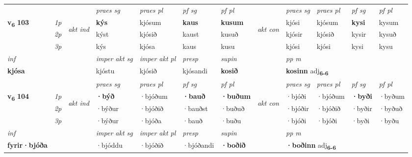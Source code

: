 \begin{longtable}[l]{X>{\footnotesize\itshape}llXXXXlXXXX}
 & &   & \textit{praes sg}  & \textit{praes pl}    & \textit{ pf sg} & \textit{pf pl} & & \textit{praes sg}  & \textit{praes pl}    & \textit{pf sg} & \textit{pf pl }  \\ \cmidrule{4-7} \cmidrule{9-12}
 \multirow{2}{*}{{{\textbf{v{\textsubscript{6}}} \Large{\textbf{103}}}}}  & 1p & \multirow{3}{*}{\begin{turn}{90}\textit{akt ind}\end{turn}} & \textbf{kýs} & kjósum & \textbf{kaus} & \textbf{kusum} & \multirow{3}{*}{\begin{turn}{90}\textit{akt con}\end{turn}} &kjósi & kjósum & \textbf{kysi} & kysum\\*
 & 2p &  &  kýst  & kjósið & kaust & kusuð & & kjósir & kjósið & kysir & kysuð \\*
 & 3p &  & kýs & kjósa & kaus & kusu & & kjósi & kjósi& kysi & kysu \\*
\cmidrule{4-7} \cmidrule{9-12}

   {\textit{inf}} & &  & \textit{imper akt sg} & \textit{imper akt pl}   & \textit{presp} & \textit{supin}  && \textit{pp m} \\*
  {\textbf{kjósa}} & && kjóstu  & kjósið   & kjósandi &  \textbf{kosið}  && \multicolumn{2}{l}{\textbf{kosinn} adj\textbf{\textsubscript{6-6}}} \\*

\midrule

 & &   & \textit{praes sg}  & \textit{praes pl}    & \textit{ pf sg} & \textit{pf pl} & & \textit{praes sg}  & \textit{praes pl}    & \textit{pf sg} & \textit{pf pl }  \\ \cmidrule{4-7} \cmidrule{9-12}
 \multirow{2}{*}{{{\textbf{v{\textsubscript{6}}} \Large{\textbf{104}}}}}  & 1p & \multirow{3}{*}{\begin{turn}{90}\textit{akt ind}\end{turn}} & \textbf{·býð} & ·bjóðum & \textbf{·bauð} & \textbf{·buðum} & \multirow{3}{*}{\begin{turn}{90}\textit{akt con}\end{turn}} &·bjóði & ·bjóðum & \textbf{·byði} & ·byðum\\*
 & 2p &  &  ·býður  & ·bjóðið & ·bauðst & ·buðuð & & ·bjóðir & ·bjóðið & ·byðir & ·byðuð \\*
 & 3p &  & ·býður & ·bjóða & ·bauð & ·buðu & & ·bjóði & ·bjóði& ·byði & ·byðu \\*
\cmidrule{4-7} \cmidrule{9-12}

   {\textit{inf}} & &  & \textit{imper akt sg} & \textit{imper akt pl}   & \textit{presp} & \textit{supin}  && \textit{pp m} \\*
  {\textbf{fyrir\allowbreak ·bjóða}} & && ·bjóddu  & ·bjóðið   & ·bjóðandi &  \textbf{·boðið}  && \multicolumn{2}{l}{\textbf{·boðinn} adj\textbf{\textsubscript{6-6}}} \\*


\end{longtable}
